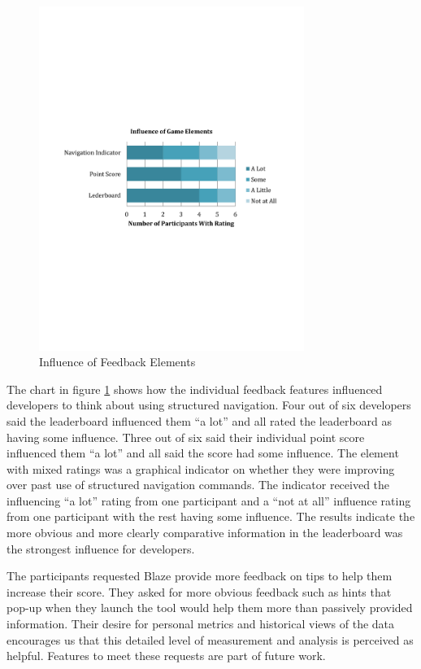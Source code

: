 \documentclass{sig-alternate}
\begin{document}
\begin{figure}
	\includegraphics[width=3.4in]{ElementInfluenceChart.pdf}
	\caption{Influence of Feedback Elements}
	\label{fig:elementInfluence}
\end{figure}

The chart in figure \ref{fig:elementInfluence} shows how the individual feedback features influenced developers to think about using structured navigation.  Four out of six developers said the leaderboard influenced them ``a lot'' and all rated the leaderboard as having some influence.  Three out of six  said their individual point score influenced them ``a lot'' and all said the score had some influence.  The element with mixed ratings was a graphical indicator on whether they were improving over past use of structured navigation commands.  The indicator received the influencing ``a lot'' rating from one participant and a ``not at all'' influence rating from one participant with the rest having some influence.  The results indicate the more obvious and more clearly comparative information in the leaderboard was the strongest influence for developers.

The participants requested Blaze provide more feedback on tips to help them increase their score. They asked for more obvious feedback such as hints that pop-up when they launch the tool would help them more than passively provided information.  Their desire for personal metrics and historical views of the data encourages us that this detailed level of measurement and analysis is perceived as helpful.  Features to meet these requests are part of future work.    
\end{document}
